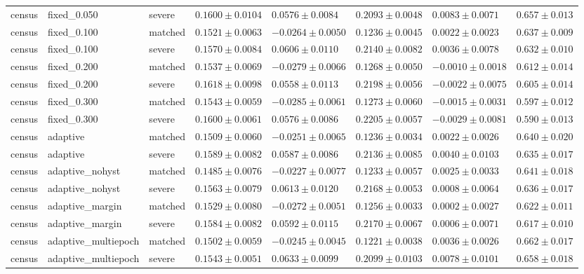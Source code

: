 \begin{table}[!t]
{\begin{tabular}{llllllll}
census & fixed\_0.050 & severe & $0.1600\pm0.0104$ & $0.0576\pm0.0084$ & $0.2093\pm0.0048$ & $0.0083\pm0.0071$ & $0.657\pm0.013$ \\
census & fixed\_0.100 & matched & $0.1521\pm0.0063$ & $-0.0264\pm0.0050$ & $0.1236\pm0.0045$ & $0.0022\pm0.0023$ & $0.637\pm0.009$ \\
census & fixed\_0.100 & severe & $0.1570\pm0.0084$ & $0.0606\pm0.0110$ & $0.2140\pm0.0082$ & $0.0036\pm0.0078$ & $0.632\pm0.010$ \\
census & fixed\_0.200 & matched & $0.1537\pm0.0069$ & $-0.0279\pm0.0066$ & $0.1268\pm0.0050$ & $-0.0010\pm0.0018$ & $0.612\pm0.014$ \\
census & fixed\_0.200 & severe & $0.1618\pm0.0098$ & $0.0558\pm0.0113$ & $0.2198\pm0.0056$ & $-0.0022\pm0.0075$ & $0.605\pm0.014$ \\
census & fixed\_0.300 & matched & $0.1543\pm0.0059$ & $-0.0285\pm0.0061$ & $0.1273\pm0.0060$ & $-0.0015\pm0.0031$ & $0.597\pm0.012$ \\
census & fixed\_0.300 & severe & $0.1600\pm0.0061$ & $0.0576\pm0.0086$ & $0.2205\pm0.0057$ & $-0.0029\pm0.0081$ & $0.590\pm0.013$ \\
census & adaptive & matched & $0.1509\pm0.0060$ & $-0.0251\pm0.0065$ & $0.1236\pm0.0034$ & $0.0022\pm0.0026$ & $0.640\pm0.020$ \\
census & adaptive & severe & $0.1589\pm0.0082$ & $0.0587\pm0.0086$ & $0.2136\pm0.0085$ & $0.0040\pm0.0103$ & $0.635\pm0.017$ \\
census & adaptive\_nohyst & matched & $0.1485\pm0.0076$ & $-0.0227\pm0.0077$ & $0.1233\pm0.0057$ & $0.0025\pm0.0033$ & $0.641\pm0.018$ \\
census & adaptive\_nohyst & severe & $0.1563\pm0.0079$ & $0.0613\pm0.0120$ & $0.2168\pm0.0053$ & $0.0008\pm0.0064$ & $0.636\pm0.017$ \\
census & adaptive\_margin & matched & $0.1529\pm0.0080$ & $-0.0272\pm0.0051$ & $0.1256\pm0.0033$ & $0.0002\pm0.0027$ & $0.622\pm0.011$ \\
census & adaptive\_margin & severe & $0.1584\pm0.0082$ & $0.0592\pm0.0115$ & $0.2170\pm0.0067$ & $0.0006\pm0.0071$ & $0.617\pm0.010$ \\
census & adaptive\_multiepoch & matched & $0.1502\pm0.0059$ & $-0.0245\pm0.0045$ & $0.1221\pm0.0038$ & $0.0036\pm0.0026$ & $0.662\pm0.017$ \\
census & adaptive\_multiepoch & severe & $0.1543\pm0.0051$ & $0.0633\pm0.0099$ & $0.2099\pm0.0103$ & $0.0078\pm0.0101$ & $0.658\pm0.018$ \\

\end{tabular}}
\end{table}
